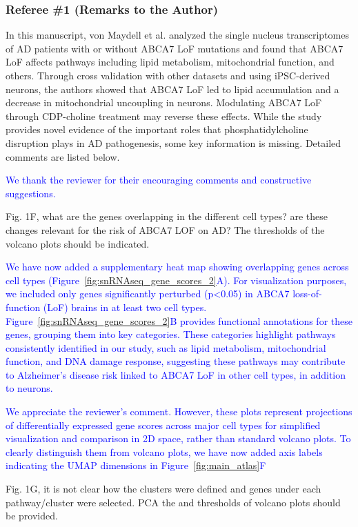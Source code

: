 \subsubsection*{Referee \#1 (Remarks to the Author)}
In this manuscript, von Maydell et al. analyzed the single nucleus transcriptomes of AD patients with or without ABCA7 LoF mutations and found that ABCA7 LoF affects pathways including lipid metabolism, mitochondrial function, and others. Through cross validation with other datasets and using iPSC-derived neurons, the authors showed that ABCA7 LoF led to lipid accumulation and a decrease in mitochondrial uncoupling in neurons. Modulating ABCA7 LoF through CDP-choline treatment may reverse these effects.
While the study provides novel evidence of the important roles that phosphatidylcholine disruption plays in AD pathogenesis, some key information is missing. Detailed comments are listed below.

\textcolor{blue}{We thank the reviewer for their encouraging comments and constructive suggestions.}

Fig. 1F, what are the genes overlapping in the different cell types? are these changes relevant for the risk of ABCA7 LOF on AD? The thresholds of the volcano plots should be indicated.

\textcolor{blue}{We have now added a supplementary heat map showing overlapping genes across cell types (Figure~\ref{fig:snRNAseq_gene_scores_2}A). For visualization purposes, we included only genes significantly perturbed (p<0.05) in ABCA7 loss-of-function (LoF) brains in at least two cell types. Figure~\ref{fig:snRNAseq_gene_scores_2}B provides functional annotations for these genes, grouping them into key categories. These categories highlight pathways consistently identified in our study, such as lipid metabolism, mitochondrial function, and DNA damage response, suggesting these pathways may contribute to Alzheimer's disease risk linked to ABCA7 LoF in other cell types, in addition to neurons.}

\textcolor{blue}{We appreciate the reviewer's comment. However, these plots represent projections of differentially expressed gene scores across major cell types for simplified visualization and comparison in 2D space, rather than standard volcano plots. To clearly distinguish them from volcano plots, we have now added axis labels indicating the UMAP dimensions in Figure~\ref{fig:main_atlas}F}

Fig. 1G, it is not clear how the clusters were defined and genes under each pathway/cluster were selected. PCA the and thresholds of volcano plots should be provided.

